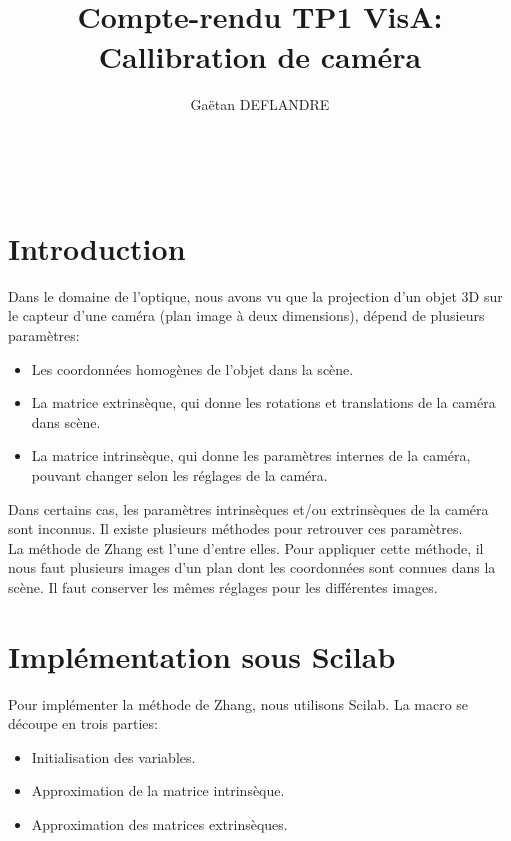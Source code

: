 \documentclass[a4paper,11pt]{article}
\title{
  \noindent\hrulefill \\
  \vspace{10mm} Compte-rendu TP1 VisA: Callibration de caméra
}
\author{Gaëtan DEFLANDRE}
\begin{document}
\maketitle

\noindent\hrulefill \\


\section{Introduction}

Dans le domaine de l'optique, nous avons vu que la projection d'un objet 3D sur 
le capteur d'une caméra (plan image à deux dimensions), dépend de plusieurs paramètres:
\begin{itemize}
 \item Les coordonnées homogènes de l'objet dans la scène.
 \item La matrice extrinsèque, qui donne les rotations et translations de la caméra dans scène.
 \item La matrice intrinsèque, qui donne les paramètres internes de la caméra, pouvant changer 
 selon les réglages de la caméra.\\
\end{itemize}

Dans certains cas, les paramètres intrinsèques et/ou extrinsèques de la caméra sont 
inconnus. Il existe plusieurs méthodes pour retrouver ces paramètres.\\

La méthode de Zhang est l'une d'entre elles. Pour appliquer cette méthode, il nous faut 
plusieurs images d'un plan dont les coordonnées sont connues dans la scène. Il faut conserver 
les mêmes réglages pour les différentes images.\\

\newpage

\section{Implémentation sous Scilab}

Pour implémenter la méthode de Zhang, nous utilisons Scilab. La macro se découpe en trois 
parties:
\begin{itemize}
 \item Initialisation des variables.
 \item Approximation de la matrice intrinsèque.
 \item Approximation des matrices extrinsèques.\\
\end{itemize}
\end{document}
